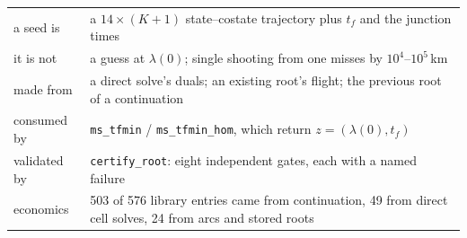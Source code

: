 \documentclass[11pt]{article}
\newcommand{\tf}{t_f}\newcommand{\R}{\mathbb{R}}
\newcommand{\file}[1]{\texttt{#1}}
\begin{document}
\noindent
\begin{tabular}{@{}p{}p{}@{}}
\toprule
a seed is & a $14\times(K{+}1)$ state--costate trajectory plus $\tf$ and the junction times \\
it is not & a guess at $\lambda(0)$; single shooting from one misses by $10^4$--$10^5$\,km \\
made from & a direct solve's duals; an existing root's flight; the previous root of a continuation \\
consumed by & \file{ms\_tfmin} / \file{ms\_tfmin\_hom}, which return $z=(\lambda(0),\tf)$ \\
validated by & \file{certify\_root}: eight independent gates, each with a named failure \\
economics & 503 of 576 library entries came from continuation, 49 from direct cell solves, 24 from arcs and stored roots \\
\bottomrule
\end{tabular}
\end{document}
